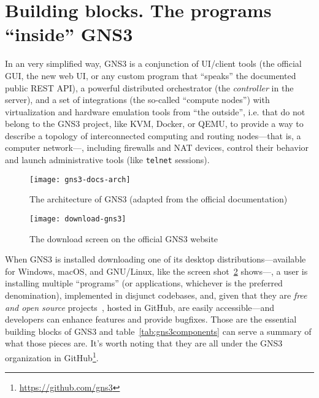 



\section{Building blocks. The programs ``inside'' GNS3}
\label{sec:gns3buildingblocks}

In an very simplified way, GNS3 is a conjunction of UI/client tools (the official GUI, the new web UI, or any custom program that ``speaks'' the documented public \acrshort{REST} API), a powerful distributed orchestrator (the \emph{controller} in the server), and a set of integrations (the so-called ``compute nodes'') with virtualization and hardware emulation tools from ``the outside'', i.e. that do not belong to the GNS3 project, like KVM, Docker, or QEMU, to provide a way to describe a topology of interconnected computing and routing nodes---that is, a computer network---, including firewalls and NAT devices, control their behavior and launch administrative tools (like \texttt{telnet} sessions). %

\begin{figure}
  \centering
  \texttt{[image: gns3-docs-arch]}
  \caption{The architecture of GNS3 (adapted from the official documentation)}
  \label{fig:gns3-docs-arch}
\end{figure}


\begin{figure}
  \centering
  \texttt{[image: download-gns3]}
  \caption{The download screen on the official GNS3 website}
  \label{fig:download-gns3}
\end{figure}

When GNS3 is installed downloading one of its desktop distributions---available for Windows, macOS, and GNU/Linux, like the screen shot~\ref{fig:download-gns3} shows---, a user is installing multiple ``programs'' (or applications, whichever is the preferred denomination), implemented in disjunct codebases, and, given that they are \emph{free and open source} projects~\cite{gplv3}, hosted in GitHub, are easily accessible---and developers can enhance features and provide bugfixes.
Those are the essential building blocks of GNS3 and table~\ref{tab:gns3components} can serve a summary of what those pieces are.
It's worth noting that they are all under the GNS3 organization in GitHub\footnote{\url{https://github.com/gns3}}.

